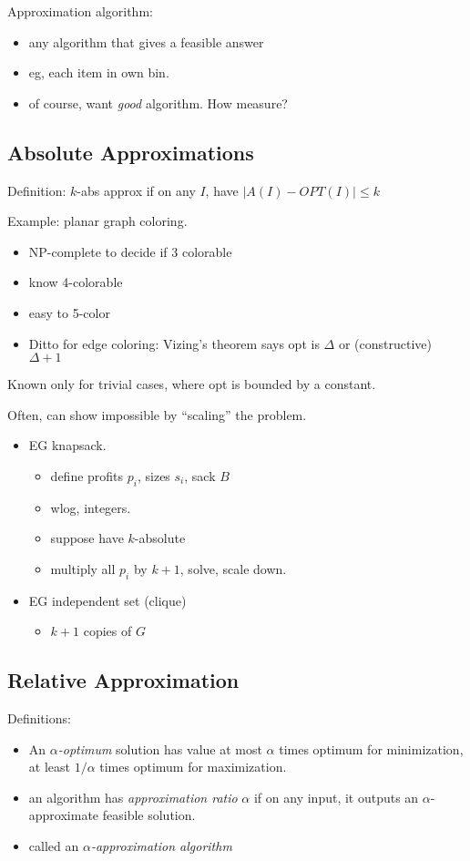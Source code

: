 \documentclass{article}
\begin{document}
Approximation algorithm:
\begin{itemize}
\item any algorithm that gives a feasible answer
\item eg, each item in own bin.
\item of course, want \emph{good} algorithm.  How measure?
\end{itemize}

\subsection*{Absolute Approximations}

Definition: $k$-abs approx if on any $I$, have $|A(I)-OPT(I)| \le k$

Example: planar graph coloring.
\begin{itemize}
\item NP-complete to decide if 3 colorable
\item know 4-colorable
\item easy to 5-color
\item Ditto for edge coloring: Vizing's theorem says opt is $\Delta$
  or (constructive) $\Delta+1$
\end{itemize}
Known only for trivial cases, where opt is bounded by a constant.

Often, can show impossible by ``scaling'' the problem.
\begin{itemize}
\item 
EG knapsack.
\begin{itemize}
\item define profits $p_i$, sizes $s_i$, sack $B$
\item wlog, integers.
\item suppose have $k$-absolute
\item multiply all $p_i$ by $k+1$, solve, scale down.
\end{itemize}
\item 
EG independent set (clique)
\begin{itemize}
\item $k+1$ copies of $G$
\end{itemize}
\end{itemize}

\subsection*{Relative Approximation}

Definitions:
\begin{itemize}
\item 
An \emph{$\alpha$-optimum} solution has value at most $\alpha$ times
optimum for minimization, at least $1/\alpha$ times optimum for
maximization.  
\item an algorithm has \emph{approximation ratio} $\alpha$ if on any
  input, it outputs an $\alpha$-approximate feasible solution.
\item called an \emph{$\alpha$-approximation algorithm}
\end{itemize}
\end{document}
